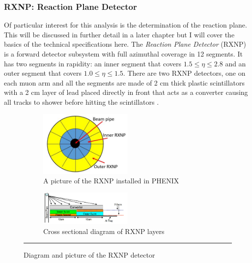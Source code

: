 \subsubsection{RXNP: Reaction Plane Detector}
Of particular interest for this analysis is the determination of the reaction plane. This will be discussed in further detail in a later chapter but I will cover the basics of the technical specifications here. The \textit{Reaction Plane Detector} (RXNP) is a forward detector subsystem \citep{RXNPfocus} with full azimuthal coverage in 12 segments. It has two segments in rapidity: an inner segment that covers $1.5 \leq \eta \leq 2.8$ and an outer segment that covers $1.0 \leq \eta \leq 1.5$. There are two RXNP detectors, one on each muon arm and all the segments are made of 2 cm thick plastic scintillators with a 2 cm layer of lead placed directly in front that acts as a converter causing all tracks to shower before hitting the scintillators \citep{RXNPfocusER}.  
\begin{figure}
\begin{subfigure}[b]{1\textwidth}
    \centering
    \includegraphics[width=0.5\textwidth]{Figures/RXNPdiagram.JPG}
    \caption{A picture of the RXNP installed in PHENIX}

\end{subfigure}
\begin{subfigure}[b]{1\textwidth}
\centering
  \includegraphics[width=0.5\textwidth]{Figures/RXNPschem.jpg}
  \caption{Cross sectional diagram of RXNP layers}
\end{subfigure}

  \rule{35em}{0.5pt}
\caption[Diagram and picture of the RXNP detector]{Diagram and picture of the RXNP detector}
      \label{fig:RXNP}
\end{figure}


